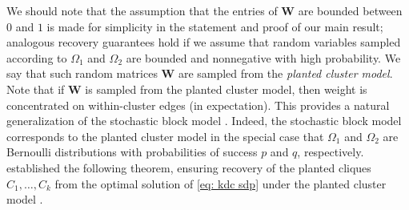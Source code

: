 \documentclass[twoside,11pt]{article}
\newcommand{\bs}{\boldsymbol}
\newcommand{\W}{\bs {W}}
\newcommand{\0}{\bs{0}}
\newcommand{\kdc}{\(k\)-disjoint-clique }
\begin{document}
{We should note that the assumption that the entries of \(\W\) are bounded between \(0\) and 
\(1\) is made for simplicity in the statement and proof of our main result;
analogous recovery guarantees hold if we assume that random variables
sampled according to \(\Omega_1\) and \(\Omega_2\)
are bounded and nonnegative with high probability.
We say that such random matrices \(\W\) are sampled from the \emph{planted cluster model}.
Note that if \(\W\) is sampled from the planted cluster model, then weight is concentrated
on within-cluster edges (in expectation).
This provides a natural generalization of the stochastic block model .
Indeed, the stochastic block model corresponds to the planted cluster model
in the special case that \(\Omega_1\) and \(\Omega_2\) are Bernoulli distributions with probabilities of 
success \(p\) and \(q\), respectively.
\cite{ames2014guaranteed} established the following theorem, ensuring recovery of the planted cliques
\(C_1, \dots, C_k\) from the optimal solution of \eqref{eq: kdc sdp} under the planted cluster model \citep[see][Theorem 2.1]{ames2014guaranteed}.

}
\end{document}
